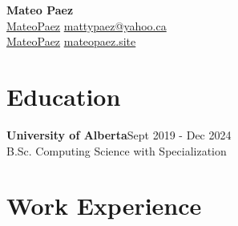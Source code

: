 \documentclass[letterpaper, 10pt]{article}
\newcommand{\iconSpace}{\hspace{2px}}
\newcommand{\hSpace}{\hspace{8px}}
\newcommand{\secStartSpace}{\vspace{3pt}}
\newcommand{\secEndSpace}{\vspace{5pt}}
\newcommand{\spaceCollapse}{\vspace{-2pt}}
\begin{document}
\begin{center} 
	{\Huge \textbf{Mateo Paez}}\\
	\vspace{1px}
 \color{TextColor}
	{
		\color{white}
             \iconSpace \href{https://www.linkedin.com/in/mateopaez/}{MateoPaez}
		\hfill
		\href{mailto:mattypaez@yahoo.ca}{mattypaez@yahoo.ca} \vspace{2pt} \iconSpace {} 
        }\\
	{
            \color{white}
		 \iconSpace \href{https://github.com/mateopaez}{MateoPaez}
            \hfill
		\href{https://mateopaez.site/}{mateopaez.site} \iconSpace {} 
	}
\end{center}
\spaceCollapse
\spaceCollapse

\section{\color{blue} \textbf{Education}}
\secStartSpace

\begin{addmargin}[0.5em]{1em}
	\large\textbf{University of Alberta}\hfill \normalsize{Sept 2019 - Dec 2024} \\
	\setlength\parindent{1cm} B.Sc. Computing Science with Specialization
\end{addmargin}
\secEndSpace
\secEndSpace



\section{\color{blue} \textbf{Work Experience}}
\secStartSpace
\end{document}

